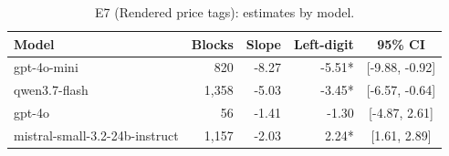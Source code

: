 \begin{table}[t]
\centering
\caption{E7 (Rendered price tags): estimates by model.}
\label{tab:e7model}
\small
\begin{tabular}{lrrrc}
\toprule
Model & Blocks & Slope & Left-digit & 95\% CI \\
\midrule
gpt-4o-mini &   820 & -8.27 & -5.51* & [-9.88, -0.92] \\
qwen3.7-flash & 1,358 & -5.03 & -3.45* & [-6.57, -0.64] \\
gpt-4o &    56 & -1.41 & -1.30 & [-4.87, 2.61] \\
mistral-small-3.2-24b-instruct & 1,157 & -2.03 & 2.24* & [1.61, 2.89] \\
\bottomrule
\end{tabular}
\end{table}
